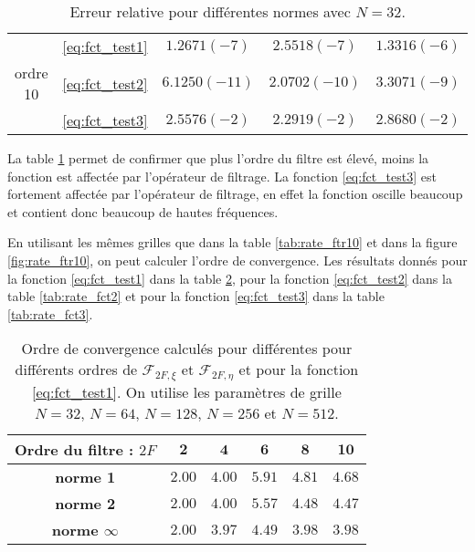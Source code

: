 \begin{table}[htbp]
\begin{center}
\begin{tabular}{|c||c||c|c|c|}
     & \eqref{eq:fct_test1} 
     & $1.2671(-7)$  & $2.5518(-7)$  & $1.3316(-6)$  \\
ordre 10	& \eqref{eq:fct_test2} & $6.1250(-11)$  & $2.0702(-10)$  & $3.3071(-9)$  \\
     & \eqref{eq:fct_test3} & $2.5576(-2)$  & $2.2919(-2)$  & $2.8680(-2)$  \\
\hline

\end{tabular}
\end{center}
\caption{Erreur relative pour différentes normes avec $N=32$.}
\label{tab:diff_ftr}
\end{table} 

La table \ref{tab:diff_ftr} permet de confirmer que plus l'ordre du filtre est élevé, moins la fonction est affectée par l'opérateur de filtrage. La fonction \eqref{eq:fct_test3} est fortement affectée par l'opérateur de filtrage, en effet la fonction oscille beaucoup et contient donc beaucoup de hautes fréquences.

En utilisant les mêmes grilles que dans la table \ref{tab:rate_ftr10} et dans la figure \ref{fig:rate_ftr10}, on peut calculer l'ordre de convergence. Les résultats donnés pour la fonction \eqref{eq:fct_test1} dans la table \ref{tab:rate_fct1}, pour la fonction \eqref{eq:fct_test2} dans la table \ref{tab:rate_fct2} et pour la fonction \eqref{eq:fct_test3} dans la table \ref{tab:rate_fct3}.

\begin{table}[htbp]
\begin{center}
\begin{tabular}{|c||c|c|c|c|c|}
\hline
\textbf{Ordre du filtre :} $2F$ & $\mathbf{2}$ & $\mathbf{4}$ & $\mathbf{6}$ & $\mathbf{8}$ & $\mathbf{10}$ \\
\hline
\hline
\textbf{norme 1} & $2.00$ & $4.00$ & $5.91$ & $4.81$ & $4.68$\\
\textbf{norme 2} & $2.00$ & $4.00$ & $5.57$ & $4.48$ & $4.47$\\
\textbf{norme $\infty$} & $2.00$ & $3.97$ & $4.49$ & $3.98$ & $3.98$\\
\hline
\end{tabular}
\end{center}
\caption{Ordre de convergence calculés pour différentes pour différents ordres de $\mathcal{F}_{2F,\xi}$ et $\mathcal{F}_{2F,\eta}$ et pour la fonction \eqref{eq:fct_test1}. On utilise les paramètres de grille $N=32$, $N=64$, $N=128$, $N=256$ et $N=512$.}
\label{tab:rate_fct1}
\end{table} 

